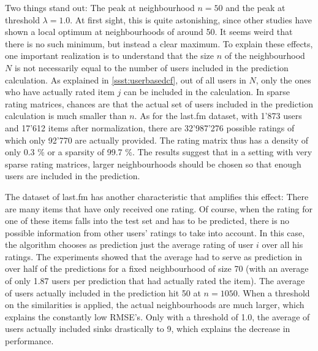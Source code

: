 Two things stand out: The peak at neighbourhood $n=50$ and the peak at threshold $\lambda = 1.0$. At first sight, this is quite astonishing, since other studies have shown a local optimum at neighbourhoods of around 50. It seems weird that there is no such minimum, but instead a clear maximum. To explain these effects, one important realization is to understand that the size $n$ of the neighbourhood $N$ is not necessarily equal to the number of users included in the prediction calculation. As explained in \ref{ssst:userbasedcf}, out of all users in $N$, only the ones who have actually rated item $j$ can be included in the calculation. In sparse rating matrices, chances are that the actual set of users included in the prediction calculation is much smaller than $n$. As for the last.fm dataset, with 1'873 users and 17'612 items after normalization, there are 32'987'276 possible ratings of which only 92'770 are actually provided. The rating matrix thus has a density of only 0.3 \% or a sparsity of 99.7 \%. The results suggest that in a setting with very sparse rating matrices, larger neighbourhoods should be chosen so that enough users are included in the prediction.

The dataset of last.fm has another characteristic that amplifies this effect: There are many items that have only received one rating. Of course, when the rating for one of these items falls into the test set and has to be predicted, there is no possible information from other users' ratings to take into account. In this case, the algorithm chooses as prediction just the average rating of user $i$ over all his ratings. The experiments showed that the average had to serve as prediction in over half of the predictions for a fixed neighbourhood of size 70 (with an average of only 1.87 users per prediction that had actually rated the item). The average of users actually included in the prediction hit 50 at $n = 1050$. When a threshold on the similarities is applied, the actual neighbourhoods are much larger, which explains the constantly low RMSE's. Only with a threshold of 1.0, the average of users actually included sinks drastically to 9, which explains the decrease in performance.